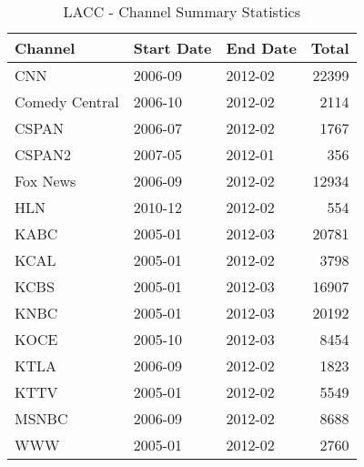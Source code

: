 \begin{table}[ht]
\centering
\caption{LACC - Channel Summary Statistics} 
\label{tab:lacc_channels}
\begin{tabular}{lllr}
  \hline
Channel & Start Date & End Date & Total \\ 
  \hline
CNN & 2006-09 & 2012-02 & 22399 \\ 
  Comedy Central & 2006-10 & 2012-02 & 2114 \\ 
  CSPAN & 2006-07 & 2012-02 & 1767 \\ 
  CSPAN2 & 2007-05 & 2012-01 & 356 \\ 
  Fox News & 2006-09 & 2012-02 & 12934 \\ 
  HLN & 2010-12 & 2012-02 & 554 \\ 
  KABC & 2005-01 & 2012-03 & 20781 \\ 
  KCAL & 2005-01 & 2012-02 & 3798 \\ 
  KCBS & 2005-01 & 2012-03 & 16907 \\ 
  KNBC & 2005-01 & 2012-03 & 20192 \\ 
  KOCE & 2005-10 & 2012-03 & 8454 \\ 
  KTLA & 2006-09 & 2012-02 & 1823 \\ 
  KTTV & 2005-01 & 2012-02 & 5549 \\ 
  MSNBC & 2006-09 & 2012-02 & 8688 \\ 
  WWW & 2005-01 & 2012-02 & 2760 \\ 
   \hline
\end{tabular}
\end{table}
